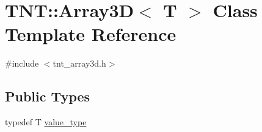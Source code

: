 \hypertarget{classTNT_1_1Array3D}{}\section{T\+NT\+:\+:Array3D$<$ T $>$ Class Template Reference}
\label{classTNT_1_1Array3D}


{\ttfamily \#include $<$tnt\+\_\+array3d.\+h$>$}

\subsection*{Public Types}
\begin{DoxyCompactItemize}
\item 
typedef T \hyperlink{classTNT_1_1Array3D_a51945370abf416e829e6a50bdb0af6d5}{value\+\_\+type}
\end{DoxyCompactItemize}
